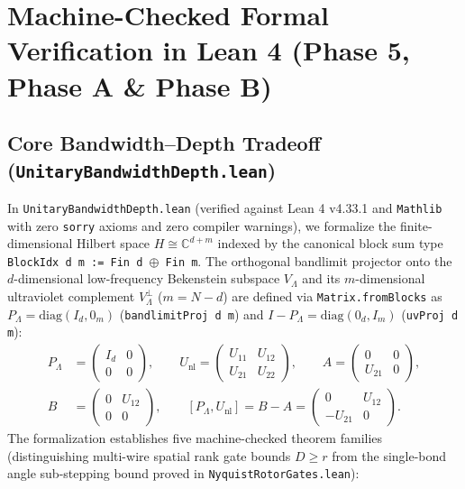 \documentclass[11pt,a4paper]{article}
\theoremstyle{definition}
\begin{document}
\section{Machine-Checked Formal Verification in Lean 4 (Phase 5, Phase A \& Phase B)}
\label{sec:phase5}
\subsection{Core Bandwidth--Depth Tradeoff (\texttt{UnitaryBandwidthDepth.lean})}
\label{subsec:phase5-core}
In \texttt{Unitary\allowbreak{}Bandwidth\allowbreak{}Depth.lean} (verified against Lean 4 v4.33.1 and \texttt{Mathlib}~\cite{mathlib2020} with zero \texttt{sorry} axioms and zero compiler warnings), we formalize the finite-dimensional Hilbert space $H \cong \mathbb{C}^{d + m}$ indexed by the canonical block sum type \texttt{BlockIdx d m := Fin d $\oplus$ Fin m}. The orthogonal bandlimit projector onto the $d$-dimensional low-frequency Bekenstein subspace $V_{\Lambda}$ and its $m$-dimensional ultraviolet complement $V_{\Lambda}^{\perp}$ ($m = N - d$) are defined via \texttt{Matrix.fromBlocks} as $P_{\Lambda} = \mathrm{diag}(I_d, 0_m)$ (\texttt{bandlimitProj d m}) and $I - P_{\Lambda} = \mathrm{diag}(0_d, I_m)$ (\texttt{uvProj d m}):
\begin{equation}
\begin{aligned}
P_{\Lambda} &= \begin{pmatrix} I_d & 0 \\ 0 & 0 \end{pmatrix}, \qquad U_{\text{nl}} = \begin{pmatrix} U_{11} & U_{12} \\ U_{21} & U_{22} \end{pmatrix}, \qquad A = \begin{pmatrix} 0 & 0 \\ U_{21} & 0 \end{pmatrix}, \\[4pt]
B &= \begin{pmatrix} 0 & U_{12} \\ 0 & 0 \end{pmatrix}, \qquad [P_{\Lambda}, U_{\text{nl}}] = B - A = \begin{pmatrix} 0 & U_{12} \\ -U_{21} & 0 \end{pmatrix}.
\end{aligned}
\end{equation}
The formalization establishes five machine-checked theorem families (distinguishing multi-wire spatial rank gate bounds $D \ge r$ from the single-bond angle sub-stepping bound proved in \texttt{Nyquist\allowbreak{}Rotor\allowbreak{}Gates.lean}):
\end{document}
